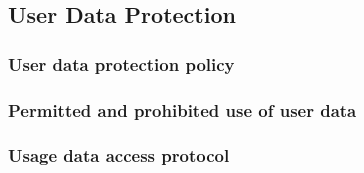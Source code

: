 \documentclass{article}
\begin{document}

\subsection{User Data Protection}
\subsubsection{User data protection policy}


\subsubsection{Permitted and prohibited use of user data}


\subsubsection{Usage data access protocol}

\end{document}
